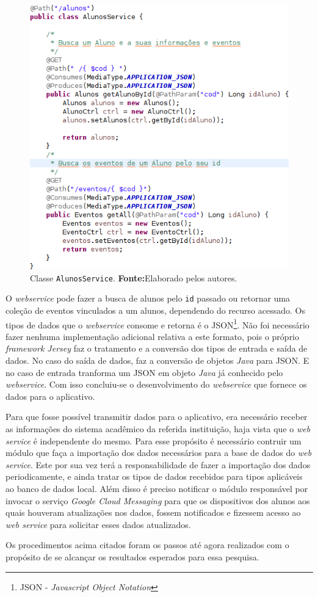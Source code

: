 		\begin{figure}[h!]
			\centerline{\includegraphics[scale=0.7]{./imagens/2_q_metodologico/qm13.png}}
			\caption[Classe \texttt{AlunosService}]{Classe \texttt{AlunosService}.
			\textbf{Fonte:}Elaborado pelos autores.}
			\label{fig:qm13}
		\end{figure}
		
		\par O \textit{webservice} pode fazer a busca de alunos pelo \texttt{id}
passado ou retornar uma coleção de eventos vinculados a um alunos, dependendo
do recurso acessado. Os tipos de dados que o \textit{webservice} consome e
retorna é o JSON\footnote{JSON - \textit{Javascript Object Notation}}. Não foi
necessário fazer nenhuma implementação adicional relativa a este formato, pois
o próprio \textit{framework Jersey} faz o tratamento e a conversão dos tipos de
entrada e saída de dados. No caso do saída de dados, faz a conversão de objetos 
\textit{Java} para JSON. E no caso de entrada tranforma um JSON em objeto
\textit{Java} já conhecido pelo \textit{webservice}. Com isso concluiu-se o
desenvolvimento do \textit{webservice} que fornece os dados para o aplicativo.

	\par Para que fosse possível transmitir dados para o aplicativo, era
necessário receber as informações do sistema acadêmico da referida instituição,
haja vista que o \textit{web service} é independente do mesmo. Para esse
propósito é necessário  contruir um módulo que faça a importação dos dados
necessários para a base de dados do \textit{web service}. Este por sua vez
terá a responsabilidade de fazer a importação dos dados periodicamente, e
ainda tratar os tipos de dados recebidos para tipos aplicáveis ao banco de
dados local. Além disso é preciso notificar o módulo responsável por invocar
o serviço \textit{Google Cloud Messaging} para que os dispositivos dos alunos
aos quais houveram atualizações nos dados, fossem notificados e fizessem acesso
ao \textit{web service} para solicitar esses dados atualizados.

	\par Os procedimentos acima citados foram os passos até agora realizados com o
propósito de se alcançar os resultados esperados para essa pesquisa.
		